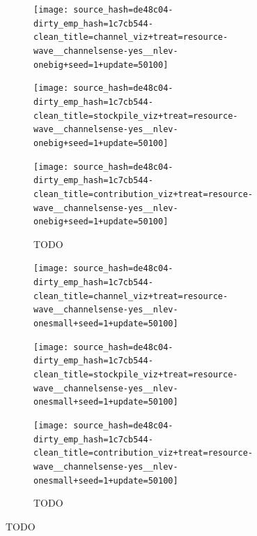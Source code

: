 \begin{figure}[!htbp]
\begin{center}
\begin{subfigure}[b]{\textwidth}
  \begin{minipage}{0.2\textwidth}
  \texttt{[image: source\_hash=de48c04-dirty\_emp\_hash=1c7cb544-clean\_title=channel\_viz+treat=resource-wave\_\_channelsense-yes\_\_nlev-onebig+seed=1+update=50100]}
  \end{minipage}
  \begin{minipage}{0.2\textwidth}
  \texttt{[image: source\_hash=de48c04-dirty\_emp\_hash=1c7cb544-clean\_title=stockpile\_viz+treat=resource-wave\_\_channelsense-yes\_\_nlev-onebig+seed=1+update=50100]}
  \end{minipage}
  \begin{minipage}{0.2\textwidth}
  \texttt{[image: source\_hash=de48c04-dirty\_emp\_hash=1c7cb544-clean\_title=contribution\_viz+treat=resource-wave\_\_channelsense-yes\_\_nlev-onebig+seed=1+update=50100]}
  \end{minipage}
  \begin{minipage}{0.2\textwidth}
  \caption{TODO}
  \label{fig:TODO}
  \end{minipage}
\end{subfigure}

\begin{subfigure}[b]{\textwidth}
  \begin{minipage}{0.2\textwidth}
  \texttt{[image: source\_hash=de48c04-dirty\_emp\_hash=1c7cb544-clean\_title=channel\_viz+treat=resource-wave\_\_channelsense-yes\_\_nlev-onesmall+seed=1+update=50100]}
  \end{minipage}
  \begin{minipage}{0.2\textwidth}
  \texttt{[image: source\_hash=de48c04-dirty\_emp\_hash=1c7cb544-clean\_title=stockpile\_viz+treat=resource-wave\_\_channelsense-yes\_\_nlev-onesmall+seed=1+update=50100]}
  \end{minipage}
  \begin{minipage}{0.2\textwidth}
  \texttt{[image: source\_hash=de48c04-dirty\_emp\_hash=1c7cb544-clean\_title=contribution\_viz+treat=resource-wave\_\_channelsense-yes\_\_nlev-onesmall+seed=1+update=50100]}
  \end{minipage}
  \begin{minipage}{0.2\textwidth}
  \caption{TODO}
  \label{fig:TODO}
  \end{minipage}
\end{subfigure}


\end{center}
\end{figure}
